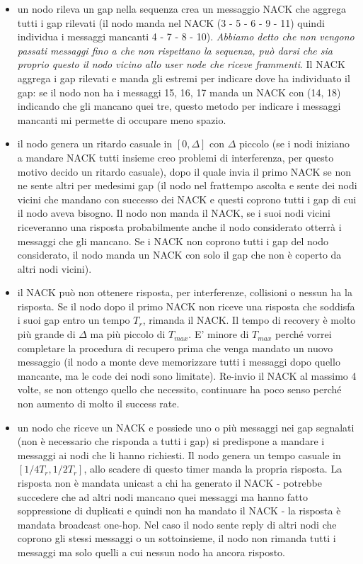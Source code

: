 \documentclass[12pt,italian]{report}
\begin{document}
\begin{itemize}
    \item un nodo rileva un gap nella sequenza crea un messaggio NACK che aggrega tutti i gap rilevati (il nodo manda nel NACK (3 - 5 - 6 - 9 - 11) quindi individua i messaggi mancanti 4 - 7 - 8 - 10). \textit{Abbiamo detto che non vengono passati messaggi fino a che non rispettano la sequenza, può darsi che sia proprio questo il nodo vicino allo user node che riceve frammenti}. Il NACK aggrega i gap rilevati e manda gli estremi per indicare dove ha individuato il gap: se il nodo non ha i messaggi 15, 16, 17 manda un NACK con (14, 18) indicando che gli mancano quei tre, questo metodo per indicare i messaggi mancanti mi permette di occupare meno spazio. 
    \item il nodo genera un ritardo casuale in $[0, \Delta]$ con $\Delta$ piccolo (se i nodi iniziano a mandare NACK tutti insieme creo problemi di interferenza, per questo motivo decido un ritardo casuale), dopo il quale invia il primo NACK se non ne sente altri per medesimi gap (il nodo nel frattempo ascolta e sente dei nodi vicini che mandano con successo dei NACK e questi coprono tutti i gap di cui il nodo aveva bisogno. Il nodo non manda il NACK, se i suoi nodi vicini riceveranno una risposta probabilmente anche il nodo considerato otterrà i messaggi che gli mancano. Se i NACK non coprono tutti i gap del nodo considerato, il nodo manda un NACK con solo il gap che non è coperto da altri nodi vicini). 
    \item il NACK può non ottenere risposta, per interferenze, collisioni o nessun ha la risposta. Se il nodo dopo il primo NACK non riceve una risposta che soddisfa i suoi gap entro un tempo $T_r$, rimanda il NACK. Il tempo di recovery è molto più grande di $\Delta$ ma più piccolo di $T_{max}$. E' minore di $T_{max}$ perché vorrei completare la procedura di recupero prima che venga mandato un nuovo messaggio (il nodo a monte deve memorizzare tutti i messaggi dopo quello mancante, ma le code dei nodi sono limitate). Re-invio il NACK al massimo 4 volte, se non ottengo quello che necessito, continuare ha poco senso perché non aumento di molto il success rate. 
    \item un nodo che riceve un NACK e possiede uno o più messaggi nei gap segnalati (non è necessario che risponda a tutti i gap) si predispone a mandare i messaggi ai nodi che li hanno richiesti. Il nodo genera un tempo casuale in $[1/4T_r, 1/2 T_r]$, allo scadere di questo timer manda la propria risposta. La risposta non è mandata unicast a chi ha generato il NACK - potrebbe succedere che ad altri nodi mancano quei messaggi ma hanno fatto soppressione di duplicati e quindi non ha mandato il NACK - la risposta è mandata broadcast one-hop. Nel caso il nodo sente reply di altri nodi che coprono gli stessi messaggi o un sottoinsieme, il nodo non rimanda tutti i messaggi ma solo quelli a cui nessun nodo ha ancora risposto. 
\end{itemize}
\end{document}
